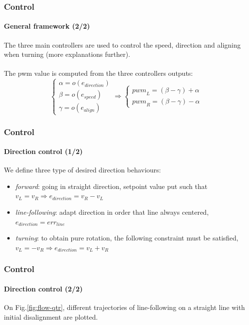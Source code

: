 \documentclass[10pt]{beamer}
\begin{document}

\begin{frame}
\frametitle{Control}
\framesubtitle{General framework (2/2)}
The three main controllers are used to control the speed, direction and aligning when turning (more explanations further).\\~\\
The pwm value is computed from the three controllers outputs:
$$ 
\left\{
    \begin{array}{ll}
		\alpha = o(e_{direction}) \\[0.3cm]
		\beta = o(e_{speed}) \\[0.3cm]
		\gamma = o(e_{align})
	\end{array}
\right.
\Rightarrow
\left\{
    \begin{array}{ll}
		{pwm}_L =  (\beta -\gamma) + \alpha \\
		{pwm}_R = (\beta - \gamma) - \alpha
	\end{array}
\right.
$$
\end{frame}


\begin{frame}
\frametitle{Control}
\framesubtitle{Direction control (1/2)}
We define three type of desired direction behaviours:
\begin{itemize}
\item \textit{forward}: going in straight direction, setpoint value put such that $v_L = v_R \Rightarrow e_{direction} = v_R - v_L$
\item \textit{line-following}: adapt direction in order that line always centered, $e_{direction} = err_{line}$
\item \textit{turning}: to obtain pure rotation, the following constraint must be satisfied, $v_L = -v_R \Rightarrow e_{direction} = v_L + v_R$ 
\end{itemize}
\end{frame}


\begin{frame}
\frametitle{Control}
\framesubtitle{Direction control (2/2)}
On Fig.\ref{fig:flow-qtr}, different trajectories of line-following on a straight line with initial disalignment are plotted.
\end{frame}

\end{document}
